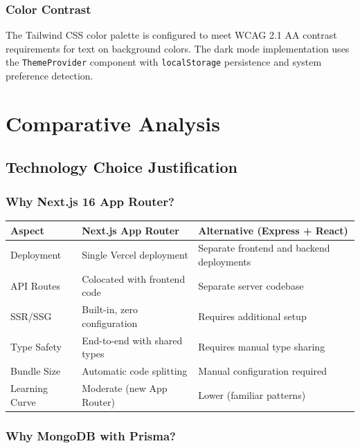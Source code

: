 \documentclass[12pt,a4paper]{report}
\begin{document}
\subsection{Color Contrast}

The Tailwind CSS color palette is configured to meet WCAG 2.1 AA contrast requirements for text on background colors. The dark mode implementation uses the \texttt{ThemeProvider} component with \texttt{localStorage} persistence and system preference detection.

\chapter{Comparative Analysis}
\section{Technology Choice Justification}

\subsection{Why Next.js 16 App Router?}

\begin{center}
\begin{tabularx}{\textwidth}{lXX}
  \toprule
  \textbf{Aspect} & \textbf{Next.js App Router} & \textbf{Alternative (Express + React)} \\
  \midrule
  Deployment & Single Vercel deployment & Separate frontend and backend deployments \\
  API Routes & Colocated with frontend code & Separate server codebase \\
  SSR/SSG & Built-in, zero configuration & Requires additional setup \\
  Type Safety & End-to-end with shared types & Requires manual type sharing \\
  Bundle Size & Automatic code splitting & Manual configuration required \\
  Learning Curve & Moderate (new App Router) & Lower (familiar patterns) \\
  \bottomrule
\end{tabularx}
\end{center}

\subsection{Why MongoDB with Prisma?}
\end{document}
